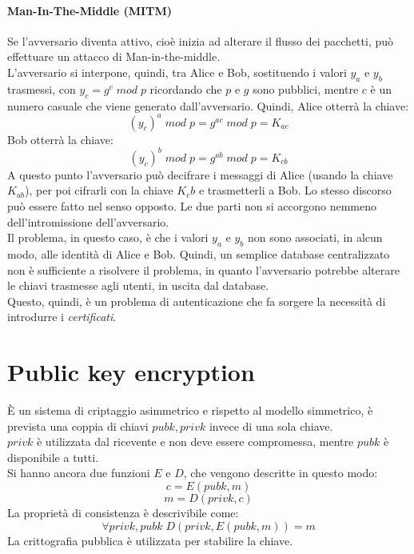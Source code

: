 \documentclass[a4paper,12pt]{article}
\begin{document}
\paragraph{Man-In-The-Middle (MITM)} Se l'avversario diventa attivo, cioè inizia ad alterare il flusso dei pacchetti, può effettuare un attacco di Man-in-the-middle. \\
L'avversario si interpone, quindi, tra Alice e Bob, sostituendo i valori $y_a$ e $y_b$ trasmessi, con $y_c = g^c\;mod\;p$ ricordando che $p$ e $g$ sono pubblici, mentre $c$ è un numero casuale che viene generato dall'avversario.
Quindi, Alice otterrà la chiave: $$(y_c)^a\;mod\;p = g^{ac}\;mod\;p = K_{ac}$$
Bob otterrà la chiave: $$(y_c)^b\;mod\;p = g^{ab}\;mod\;p = K_{cb}$$
A questo punto l'avversario può decifrare i messaggi di Alice (usando la chiave $K_{ab}$), per poi cifrarli con la chiave $K_cb$ e trasmetterli a Bob. 
Lo stesso discorso può essere fatto nel senso opposto. Le due parti non si accorgono nemmeno dell'intromissione dell'avversario. \\
Il problema, in questo caso, è che i valori $y_a$ e $y_b$ non sono associati, in alcun modo, alle identità di Alice e Bob. Quindi, un semplice database centralizzato non è sufficiente a risolvere il problema, in quanto l'avversario potrebbe alterare le chiavi trasmesse agli utenti, in uscita dal database. \\
Questo, quindi, è un problema di autenticazione che fa sorgere la necessità di introdurre i \textit{certificati}.

\newpage

\section{Public key encryption}
È un sistema di criptaggio asimmetrico e rispetto al modello simmetrico, è prevista una coppia di chiavi $pubk,privk$ invece di una sola chiave. \\
$privk$ è utilizzata dal ricevente e non deve essere compromessa, mentre $pubk$ è disponibile a tutti. \\
Si hanno ancora due funzioni $E$ e $D$, che vengono descritte in questo modo:
$$c = E(pubk,m)$$
$$m = D(privk,c)$$
La proprietà di consistenza è descrivibile come:
$$\forall privk,pubk \; D(privk, E(pubk,m)) = m$$
La crittografia pubblica è utilizzata per stabilire la chiave.
\end{document}
